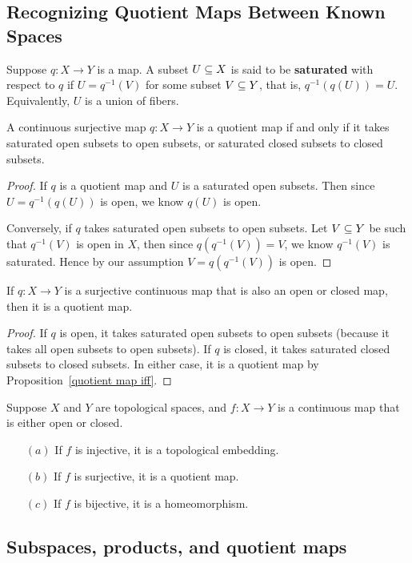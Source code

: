 \subsection{Recognizing Quotient Maps Between Known Spaces}
Suppose $q:X\to Y$ is a map. A subset $U\subseteq X$ is said to be \textbf{saturated} with respect to $q$ if $U=q^{-1}(V)$ for some subset $V\subseteq Y$, that is, $q^{-1}(q(U))=U$. Equivalently, $U$ is a union of fibers.
\begin{proposition}\label{quotient map iff}
A continuous surjective map $q:X\to Y$ is a quotient map if and only if it takes saturated open subsets to open subsets, or saturated closed subsets to closed subsets.
\end{proposition}
\begin{proof}
If $q$ is a quotient map and $U$ is a saturated open subsets. Then since $U=q^{-1}(q(U))$ is open, we know $q(U)$ is open.\par
Conversely, if $q$ takes saturated open subsets to open subsets. Let $V\subseteq Y$ be such that $q^{-1}(V)$ is open in $X$, then since $q(q^{-1}(V))=V$, we know $q^{-1}(V)$ is saturated. Hence by our assumption $V=q(q^{-1}(V))$ is open.
\end{proof}
\begin{proposition}\label{quotient open closed}
If $q:X\to Y$ is a surjective continuous map that is also an open or closed map, then it is a quotient map.
\end{proposition}
\begin{proof}
If $q$ is open, it takes saturated open subsets to open subsets (because it takes
all open subsets to open subsets). If $q$ is closed, it takes saturated closed subsets to closed subsets. In either case, it is a quotient map by Proposition~\ref{quotient map iff}.
\end{proof}
\begin{proposition}\label{closed open map inj surj bij}
Suppose $X$ and $Y$ are topological spaces, and $f:X\to Y$ is a continuous map that is either open or closed.
\begin{itemize}
\item[$(a)$]If $f$ is injective, it is a topological embedding.
\item[$(b)$]If $f$ is surjective, it is a quotient map.
\item[$(c)$]If $f$ is bijective, it is a homeomorphism.
\end{itemize}
\end{proposition}
\subsection{Subspaces, products, and quotient maps}
